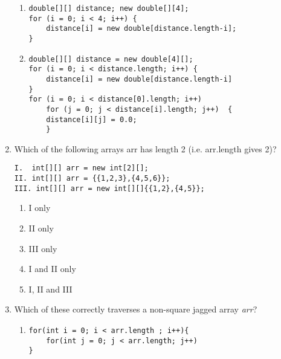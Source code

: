 \documentclass[CS180-S16-FinalExam.tex]{subfiles}
\begin{document}
\begin{enumerate}
\begin{enumerate}
\item  \begin{lstlisting}
double[][] distance; new double[][4];
for (i = 0; i < 4; i++) {
	distance[i] = new double[distance.length-i];
}
\end{lstlisting}

\item  \ifdraft \Ans \fi
\begin{lstlisting}
double[][] distance = new double[4][];
for (i = 0; i < distance.length; i++) { 
	distance[i] = new double[distance.length-i]           
}
for (i = 0; i < distance[0].length; i++)
    for (j = 0; j < distance[i].length; j++)  {
    distance[i][j] = 0.0;
    }
\end{lstlisting}
\end{enumerate}

\clearpage
\item 
Which of the following arrays arr has length 2 (i.e. arr.length gives 2)?

\begin{lstlisting}
I. 	int[][] arr = new int[2][];
II.	int[][] arr = {{1,2,3},{4,5,6}};
III. int[][] arr = new int[][]{{1,2},{4,5}};
\end{lstlisting}

\begin{enumerate}
\item I only
\item II only
\item III only
\item I and II only
\item I, II and III \ifdraft \Ans \fi
\end{enumerate}

\item Which of these correctly traverses a non-square jagged array \textit{arr}?

\begin{enumerate}
\item \begin{lstlisting}
for(int i = 0; i < arr.length ; i++){
	for(int j = 0; j < arr.length; j++)
}
\end{lstlisting}


\end{enumerate}
\end{enumerate}
\end{document}
